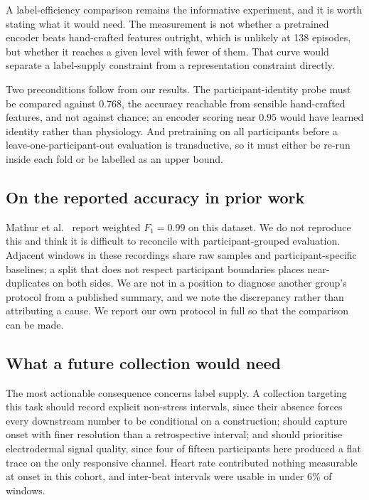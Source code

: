 \documentclass{article}
\begin{document}
A label-efficiency comparison remains the informative experiment, and it is
worth stating what it would need. The measurement is not whether a pretrained
encoder beats hand-crafted features outright, which is unlikely at 138
episodes, but whether it reaches a given level with fewer of them. That curve
would separate a label-supply constraint from a representation constraint
directly.

Two preconditions follow from our results. The participant-identity probe must
be compared against $0.768$, the accuracy reachable from sensible hand-crafted
features, and not against chance; an encoder scoring near $0.95$ would have
learned identity rather than physiology. And pretraining on all participants
before a leave-one-participant-out evaluation is transductive, so it must
either be re-run inside each fold or be labelled as an upper bound.

\subsection{On the reported accuracy in prior work}

Mathur et al.\ \cite{mathur2024} report weighted $F_1 = 0.99$ on this dataset.
We do not reproduce this and think it is difficult to reconcile with
participant-grouped evaluation. Adjacent windows in these recordings share raw
samples and participant-specific baselines; a split that does not respect
participant boundaries places near-duplicates on both sides. We are not in a
position to diagnose another group's protocol from a published summary, and we
note the discrepancy rather than attributing a cause. We report our own
protocol in full so that the comparison can be made.

\subsection{What a future collection would need}

The most actionable consequence concerns label supply. A collection targeting
this task should record explicit non-stress intervals, since their absence
forces every downstream number to be conditional on a construction; should
capture onset with finer resolution than a retrospective interval; and should
prioritise electrodermal signal quality, since four of fifteen participants
here produced a flat trace on the only responsive channel. Heart rate
contributed nothing measurable at onset in this cohort, and inter-beat
intervals were usable in under 6\% of windows.
\end{document}
